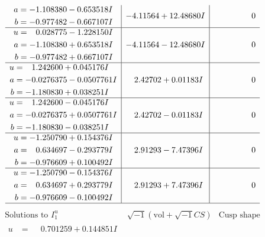 \documentclass[1p]{elsarticle_modified}
\theoremstyle{definition}
\newcommand{\I}{\sqrt{-1}}
\begin{document}
$$\begin{array}{c|c|c}
\begin{aligned}
a &= -1.108380 - 0.653518 I \\
b &= -0.977482 - 0.667107 I\end{aligned}
 & -4.11564 + 12.48680 I & \phantom{-0.000000 } 0 \\ \hline\begin{aligned}
u &= \phantom{-}0.028775 - 1.228150 I \\
a &= -1.108380 + 0.653518 I \\
b &= -0.977482 + 0.667107 I\end{aligned}
 & -4.11564 - 12.48680 I & \phantom{-0.000000 } 0 \\ \hline\begin{aligned}
u &= \phantom{-}1.242600 + 0.045176 I \\
a &= -0.0276375 - 0.0507761 I \\
b &= -1.180830 + 0.038251 I\end{aligned}
 & \phantom{-}2.42702 + 0.01183 I & \phantom{-0.000000 } 0 \\ \hline\begin{aligned}
u &= \phantom{-}1.242600 - 0.045176 I \\
a &= -0.0276375 + 0.0507761 I \\
b &= -1.180830 - 0.038251 I\end{aligned}
 & \phantom{-}2.42702 - 0.01183 I & \phantom{-0.000000 } 0 \\ \hline\begin{aligned}
u &= -1.250790 + 0.154376 I \\
a &= \phantom{-}0.634697 - 0.293779 I \\
b &= -0.976609 + 0.100492 I\end{aligned}
 & \phantom{-}2.91293 - 7.47396 I & \phantom{-0.000000 } 0 \\ \hline\begin{aligned}
u &= -1.250790 - 0.154376 I \\
a &= \phantom{-}0.634697 + 0.293779 I \\
b &= -0.976609 - 0.100492 I\end{aligned}
 & \phantom{-}2.91293 + 7.47396 I & \phantom{-0.000000 } 0\\
 \hline 
 \end{array}$$\newpage$$\begin{array}{c|c|c}  
\text{Solutions to }I^u_{1}& \I (\text{vol} + \sqrt{-1}CS) & \text{Cusp shape}\\
 \hline 
\begin{aligned}
u &= \phantom{-}0.701259 + 0.144851 I \\

\end{aligned}
\end{array}$$
\end{document}
